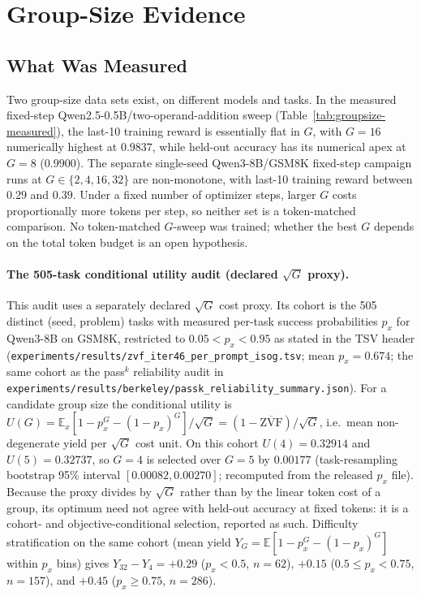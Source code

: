 \section{Group-Size Evidence}
\label{sec:appendix:group-size-reconcile}

\subsection{What Was Measured}

Two group-size data sets exist, on different models and tasks. In the
measured fixed-step Qwen2.5-0.5B/two-operand-addition sweep
(Table~\ref{tab:groupsize-measured}), the last-10 training reward is
essentially flat in $G$, with $G{=}16$ numerically highest at $0.9837$, while
held-out accuracy has its numerical apex at $G{=}8$ ($0.9900$). The separate
single-seed Qwen3-8B/GSM8K fixed-step campaign runs at $G\in\{2,4,16,32\}$
are non-monotone, with last-10 training reward between $0.29$ and $0.39$.
Under a fixed number of optimizer steps, larger $G$ costs proportionally more
tokens per step, so neither set is a token-matched comparison. No
token-matched $G$-sweep was trained; whether the best $G$ depends on the
total token budget is an open hypothesis.

\paragraph{The 505-task conditional utility audit (declared $\sqrt{G}$ proxy).}
This audit uses a separately declared $\sqrt{G}$ cost proxy. Its cohort is the 505 distinct (seed, problem) tasks with
measured per-task success probabilities $p_x$ for Qwen3-8B on GSM8K,
restricted to $0.05<p_x<0.95$ as stated in the TSV header
(\texttt{experiments/results/zvf\_iter46\_per\_prompt\_isog.tsv}; mean
$p_x{=}0.674$; the same cohort as the pass$^k$ reliability audit in
\texttt{experiments/results/berkeley/passk\_reliability\_summary.json}). For a
candidate group size the conditional utility is
$U(G)=\mathbb{E}_x\!\left[1-p_x^G-(1-p_x)^G\right]/\sqrt{G}
=(1-\overline{\mathrm{ZVF}})/\sqrt{G}$,
i.e.\ mean non-degenerate yield per $\sqrt{G}$ cost unit. On this cohort
$U(4){=}0.32914$ and $U(5){=}0.32737$, so $G{=}4$ is selected over $G{=}5$ by
$0.00177$ (task-resampling bootstrap 95\% interval $[0.00082,0.00270]$;
recomputed from the released $p_x$ file). Because the proxy divides by
$\sqrt{G}$ rather than by the linear token cost of a group, its optimum need
not agree with held-out accuracy at fixed tokens: it is a cohort- and
objective-conditional selection, reported as such.
Difficulty stratification on the same cohort (mean yield
$Y_G=\mathbb{E}[1-p_x^G-(1-p_x)^G]$ within $p_x$ bins) gives
$Y_{32}-Y_4 = {+}0.29$ ($p_x<0.5$, $n{=}62$), ${+}0.15$ ($0.5\le p_x<0.75$,
$n{=}157$), and ${+}0.45$ ($p_x\ge0.75$, $n{=}286$).

